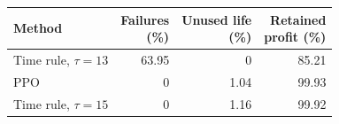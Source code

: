 {\footnotesize\setlength{\tabcolsep}{3pt}\renewcommand{\arraystretch}{1.08}%
\begin{tabular}{@{}lrrr@{}}
\toprule
Method & \shortstack{Failures\\(\%)} & \shortstack{Unused life\\(\%)} & \shortstack{Retained\\profit (\%)}\\
\midrule
Time rule, $\tau=13$ & 63.95 & 0 & 85.21\\
PPO & 0 & 1.04 & 99.93\\
Time rule, $\tau=15$ & 0 & 1.16 & 99.92\\
\bottomrule
\end{tabular}}
